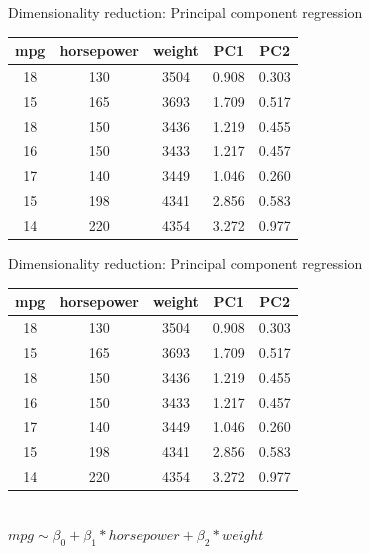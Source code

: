 \documentclass[8pt]{beamer}
\begin{document}
    \begin{frame}[t]{Dimensionality reduction: Principal component regression} %
        \centering
        \vspace{1cm}
        \begin{tabular}{|c|c|c|c|c|}
            \hline
            \textbf{mpg}&\textbf{horsepower}&\textbf{weight}&\textbf{PC1}&\textbf{PC2}\\
            \hline
            18&130&3504&0.908&0.303\\
            \hline
            15&165&3693&1.709&0.517\\
            \hline
            18&150&3436&1.219&0.455\\
            \hline
            16&150&3433&1.217&0.457\\
            \hline
            17&140&3449&1.046&0.260\\
            \hline
            15&198&4341&2.856&0.583\\
            \hline
            14&220&4354&3.272&0.977\\
            \hline
        \end{tabular}
    \end{frame}

    \begin{frame}[t]{Dimensionality reduction: Principal component regression} %
        \centering
        \vspace{1cm}
        \begin{tabular}{|c|c|c|c|c|}
            \hline
            \textbf{mpg}&\textbf{horsepower}&\textbf{weight}&\textbf{PC1}&\textbf{PC2}\\
            \hline
            18&130&3504&0.908&0.303\\
            \hline
            15&165&3693&1.709&0.517\\
            \hline
            18&150&3436&1.219&0.455\\
            \hline
            16&150&3433&1.217&0.457\\
            \hline
            17&140&3449&1.046&0.260\\
            \hline
            15&198&4341&2.856&0.583\\
            \hline
            14&220&4354&3.272&0.977\\
            \hline
        \end{tabular}\\
        \vspace{0.5cm}
        $mpg \sim \beta_0 + \beta_1 * horsepower + \beta_2 * weight$\\
    \end{frame}
\end{document}
